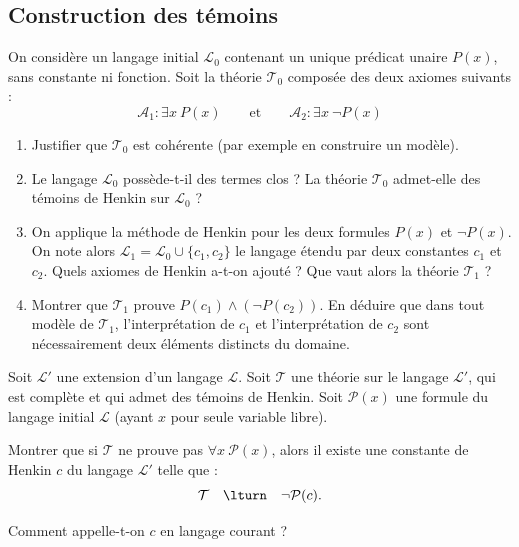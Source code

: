 \documentclass[11pt,class=report,crop=false]{standalone}
\begin{document}
\subsection*{Construction des témoins}

\begin{exercicecours}
	On considère un langage initial $\mathcal{L}_0$ contenant un unique prédicat unaire $P(x)$, sans constante ni fonction. 
	Soit la théorie $\mathcal{T}_0$ composée des deux axiomes suivants :
	\[ 
	\mathcal{A}_1 : \exists x\ P(x) \qquad \text{et} \qquad \mathcal{A}_2 : \exists x\ \lnot P(x) 
	\]
	
	\begin{enumerate}
		\item Justifier que $\mathcal{T}_0$ est cohérente (par exemple en construire un modèle).
		
		\item Le langage $\mathcal{L}_0$ possède-t-il des termes clos ? La théorie $\mathcal{T}_0$ admet-elle des témoins de Henkin sur $\mathcal{L}_0$ ?
		
		\item On applique la méthode de Henkin pour les deux formules $P(x)$ et $\lnot P(x)$. On note alors $\mathcal{L}_1 = \mathcal{L}_0 \cup \{c_1, c_2\}$ le langage étendu par deux constantes $c_1$ et $c_2$.
		Quels axiomes de Henkin a-t-on ajouté ? Que vaut alors la théorie $\mathcal{T}_1$ ?
		
		\item Montrer que $\mathcal{T}_1$ prouve $P(c_1) \land (\lnot P(c_2))$.
		En déduire que dans tout modèle de $\mathcal{T}_1$, l'interprétation de $c_1$ et l'interprétation de $c_2$ sont nécessairement deux éléments distincts du domaine. 
	\end{enumerate}
\end{exercicecours}


\begin{exercicecours}
	Soit $\mathcal{L}'$ une extension d'un langage $\mathcal{L}$.
	Soit $\mathcal{T}$ une théorie sur le langage $\mathcal{L}'$, qui est complète et qui admet des témoins de Henkin.
	Soit $\mathcal{P}(x)$ une formule du langage initial $\mathcal{L}$ (ayant $x$ pour seule variable libre).
	
	Montrer que si $\mathcal{T}$ ne prouve pas $\forall x\ \mathcal{P}(x)$, alors il existe une constante de Henkin $c$ du langage $\mathcal{L}'$ telle que :
	\[ \mathcal{T} \quad \lturn \quad \lnot \mathcal{P}(c). \]
	
	Comment appelle-t-on $c$ en langage courant ?
\end{exercicecours}
\end{document}
